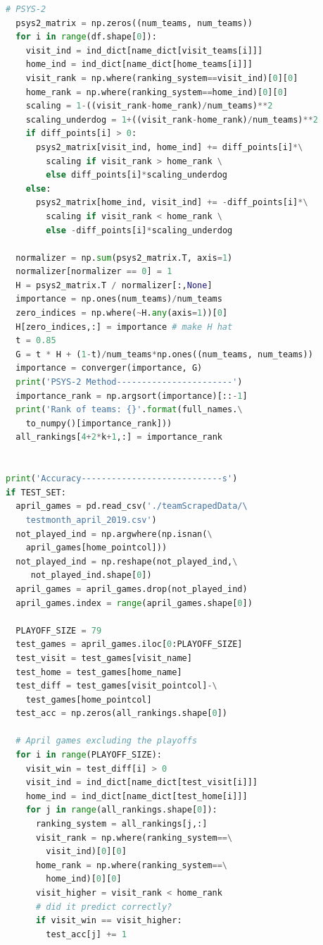 \documentclass[12pt]{article}%
\begin{document}
\begin{lstlisting}[language=Python]
  # PSYS-2
  psys2_matrix = np.zeros((num_teams, num_teams))
  for i in range(df.shape[0]):
    visit_ind = ind_dict[name_dict[visit_teams[i]]]
    home_ind = ind_dict[name_dict[home_teams[i]]]
    visit_rank = np.where(ranking_system==visit_ind)[0][0]
    home_rank = np.where(ranking_system==home_ind)[0][0]
    scaling = 1-((visit_rank-home_rank)/num_teams)**2
    scaling_underdog = 1+((visit_rank-home_rank)/num_teams)**2
    if diff_points[i] > 0:
      psys2_matrix[visit_ind, home_ind] += diff_points[i]*\
        scaling if visit_rank > home_rank \
        else diff_points[i]*scaling_underdog
    else:
      psys2_matrix[home_ind, visit_ind] += -diff_points[i]*\
        scaling if visit_rank < home_rank \
        else -diff_points[i]*scaling_underdog

  normalizer = np.sum(psys2_matrix.T, axis=1)
  normalizer[normalizer == 0] = 1
  H = psys2_matrix.T / normalizer[:,None]
  importance = np.ones(num_teams)/num_teams
  zero_indices = np.where(~H.any(axis=1))[0] 
  H[zero_indices,:] = importance # make H hat
  t = 0.85
  G = t * H + (1-t)/num_teams*np.ones((num_teams, num_teams))
  importance = converger(importance, G)
  print('PSYS-2 Method-----------------------')
  importance_rank = np.argsort(importance)[::-1]
  print('Rank of teams: {}'.format(full_names.\
    to_numpy()[importance_rank]))
  all_rankings[4+2*k+1,:] = importance_rank


print('Accuracy----------------------------s')
if TEST_SET:
  april_games = pd.read_csv('./teamScrapedData/\
    testmonth_april_2019.csv')
  not_played_ind = np.argwhere(np.isnan(\
    april_games[home_pointcol]))
  not_played_ind = np.reshape(not_played_ind,\
     not_played_ind.shape[0])
  april_games = april_games.drop(not_played_ind)
  april_games.index = range(april_games.shape[0])

  PLAYOFF_SIZE = 79
  test_games = april_games.iloc[0:PLAYOFF_SIZE]
  test_visit = test_games[visit_name]
  test_home = test_games[home_name]
  test_diff = test_games[visit_pointcol]-\
    test_games[home_pointcol]
  test_acc = np.zeros(all_rankings.shape[0])

  # April games excluding the playoffs
  for i in range(PLAYOFF_SIZE):
    visit_win = test_diff[i] > 0
    visit_ind = ind_dict[name_dict[test_visit[i]]]
    home_ind = ind_dict[name_dict[test_home[i]]]
    for j in range(all_rankings.shape[0]):
      ranking_system = all_rankings[j,:]
      visit_rank = np.where(ranking_system==\
        visit_ind)[0][0]
      home_rank = np.where(ranking_system==\
        home_ind)[0][0]
      visit_higher = visit_rank < home_rank
      # did it predict correctly?
      if visit_win == visit_higher:
        test_acc[j] += 1


\end{lstlisting}
\end{document}
